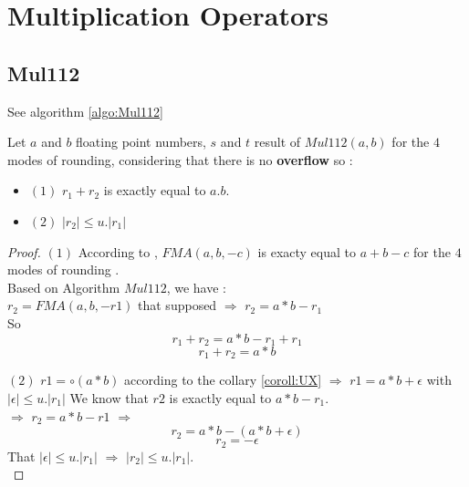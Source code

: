 \section{Multiplication Operators}

\subsection{Mul112}
See algorithm \ref{algo:Mul112}
\begin{lem}[Mul112]
Let $a$ and $b$  floating point numbers,  $s$ and $t$ result of $Mul112(a,b)$ for the $4$ modes of rounding, considering that there is no \textbf{overflow} so :
\begin{itemize}
 \item  $(1)$ $r_1+r_2$ is exactly equal to $a.b$.              
\item  $(2)$ $ \lvert r_2 \rvert \le u.\lvert r_1 \rvert $
\end{itemize} 
\end{lem}

\begin{proof} \color{-yellow}
$(1)$
According to \cite{muller2010handbook},  $FMA(a,b,-c)$ is exacty equal to $a+b-c$ for the $4$ modes of rounding .\\
Based on Algorithm $Mul112$, we have :\\
$r_2 = FMA(a,b,-r1)$ that supposed $\Rightarrow$ $r_2 = a*b -r_1$\\
So 
$$r_1 + r_2 = a*b-r_1 +r_1$$
$$r_1 + r_2 = a*b$$

$(2)$ 
$r1 = \circ (a*b)$ according to the collary \ref{coroll:UX}
$\Rightarrow$
$r1 =  a*b +\epsilon$ with $\lvert \epsilon \rvert \le u.\lvert r_1 \rvert$
We know that $r2$ is exactly equal to $a*b -r_1$.\\
$\Rightarrow$ $r_2 = a*b -r1$ $\Rightarrow$
$$r_2 = a*b -(a*b+\epsilon)$$
$$r_2 = -\epsilon$$
That $\lvert \epsilon \rvert \le u.\lvert r_1 \rvert$ $\Rightarrow$ $\lvert r_2 \rvert \le u.\lvert r_1 \rvert $.\\
\end{proof}